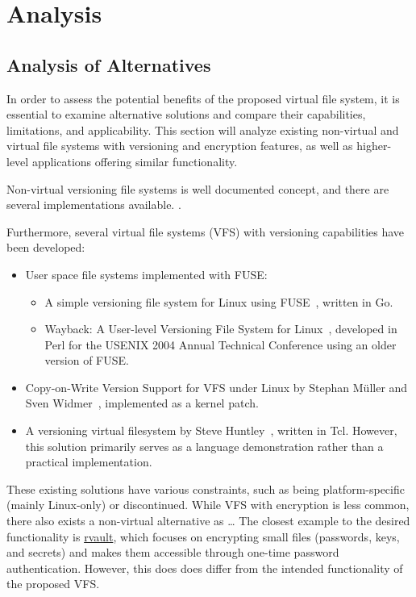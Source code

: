 \chapter{Analysis}
\label{chap:analysis}


\section{Analysis of Alternatives}\label{sec:alternatives}

In order to assess the potential benefits of the proposed virtual file system, it is essential to examine alternative solutions and compare their capabilities, limitations, and applicability.
This section will analyze existing non-virtual and virtual file systems with versioning and encryption features, as well as higher-level applications offering similar functionality.

Non-virtual versioning file systems is well documented concept, and there are several implementations available.
.

Furthermore, several virtual file systems (VFS) with versioning capabilities have been developed:

\begin{itemize}
    \item User space file systems implemented with FUSE:
    \begin{itemize}
        \item A simple versioning file system for Linux using FUSE~\cite{simple_vfs}, written in Go.
        \item Wayback: A User-level Versioning File System for Linux~\cite{wayback_vfs}, developed in Perl for the USENIX 2004 Annual Technical Conference using an older version of FUSE.
    \end{itemize}
    \item Copy-on-Write Version Support for VFS under Linux by Stephan Müller and Sven Widmer~\cite{vvfs}, implemented as a kernel patch.
    \item A versioning virtual filesystem by Steve Huntley~\cite{huntley_vvfs}, written in Tcl.
    However, this solution primarily serves as a language demonstration rather than a practical implementation.
\end{itemize}

These existing solutions have various constraints, such as being platform-specific (mainly Linux-only) or discontinued.
While VFS with encryption is less common, there also exists a non-virtual alternative as \ldots %
The closest example to the desired functionality is \href{https://github.com/rmind/rvault}{rvault}, which focuses on encrypting small files (passwords, keys, and secrets) and makes them accessible through one-time password authentication.
However, this does does differ from the intended functionality of the proposed VFS.


